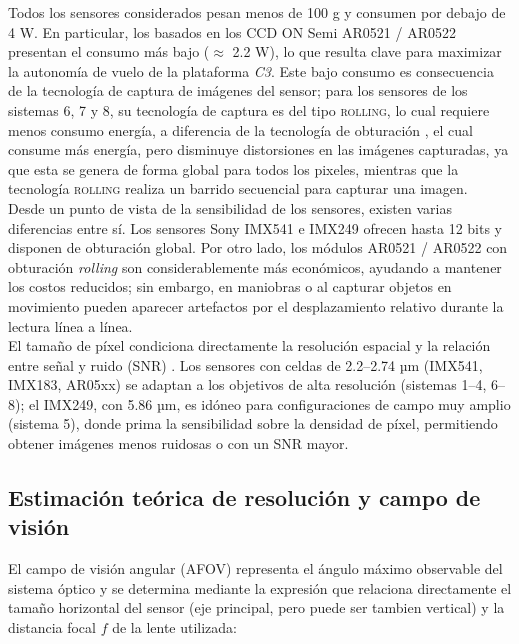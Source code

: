 \noindent Todos los sensores considerados pesan menos de 100 g y consumen por debajo de 4 W. En particular, los basados en los CCD ON Semi AR0521 / AR0522 presentan el consumo más bajo ($\approx$ 2.2 W), lo que resulta clave para maximizar la autonomía de vuelo de la plataforma \textit{C3}. Este bajo consumo es consecuencia de la tecnología de captura de imágenes del sensor; para los sensores de los sistemas 6, 7 y 8, su tecnología de captura es del tipo \textsc{rolling}, lo cual requiere menos consumo energía, a diferencia de la tecnología de obturación , el cual consume más energía, pero disminuye distorsiones en las imágenes capturadas, ya que esta se genera de forma global para todos los pixeles, mientras que la tecnología \textsc{rolling} realiza un barrido secuencial para capturar una imagen.\\

\noindent Desde un punto de vista de la sensibilidad de los sensores, existen varias diferencias entre sí. Los sensores Sony IMX541 e IMX249 ofrecen hasta 12 bits y disponen de obturación global. Por otro lado, los módulos AR0521 / AR0522 con obturación \emph{rolling} son considerablemente más económicos, ayudando a mantener los costos reducidos; sin embargo, en maniobras o al capturar objetos en movimiento pueden aparecer artefactos por el desplazamiento relativo durante la lectura línea a línea.\\

\noindent El tamaño de píxel condiciona directamente la resolución espacial y la relación entre señal y ruido (SNR) \cite{Chen2000HowBe}. Los sensores con celdas de 2.2–2.74 µm (IMX541, IMX183, AR05xx) se adaptan a los objetivos de alta resolución (sistemas 1–4, 6–8); el IMX249, con 5.86 µm, es idóneo para configuraciones de campo muy amplio (sistema 5), donde prima la sensibilidad sobre la densidad de píxel, permitiendo obtener imágenes menos ruidosas o con un SNR mayor.\\

\subsection{Estimación teórica de resolución y campo de visión}
\label{sec:res_sim}

El campo de visión angular (AFOV) representa el ángulo máximo observable del sistema óptico y se determina mediante la expresión que relaciona directamente el tamaño horizontal del sensor (eje principal, pero puede ser tambien vertical) y la distancia focal \(f\) de la lente utilizada:

